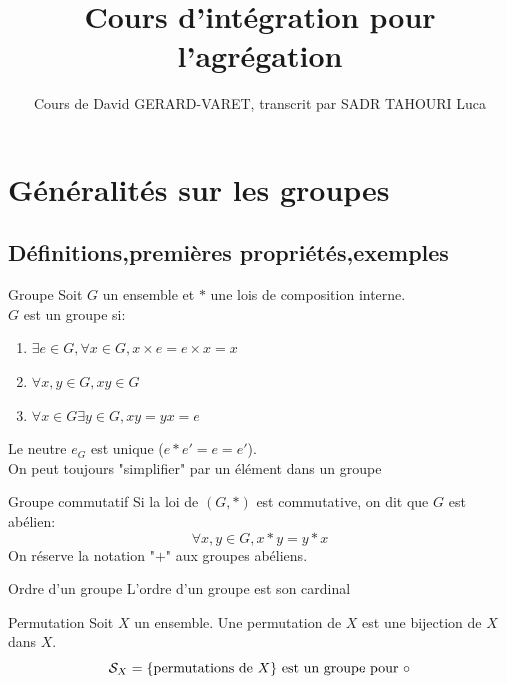 \documentclass[]{report}
\title{Cours d'intégration pour l'agrégation}
\author{Cours de David GERARD-VARET, transcrit par SADR TAHOURI Luca}
\date{}
\begin{document}
    \maketitle
    \tableofcontents

\chapter{Généralités sur les groupes}

\section{Définitions,premières propriétés,exemples}

\begin{df}{Groupe}{}
    Soit $G$ un ensemble et $*$ une lois de composition interne.\\
    $G$ est un groupe si:
    \begin{enumerate}[label=\roman*]
        \item $\exists e\in G,\forall x\in G,x\times e=e \times x=x$
        \item $\forall x,y\in G, xy\in G$
        \item $\forall x\in G\exists y\in G, xy=yx=e$
    \end{enumerate}
    
\end{df}

\begin{re}{}{}
    Le neutre $e_G$ est unique ($e*e'=e=e'$).\\
    On peut toujours "simplifier" par un élément dans un groupe
\end{re}

\begin{df}{Groupe commutatif}{}
    Si la loi de $(G,*)$ est commutative, on dit que $G$ est abélien:
    \[\forall x,y \in G,x*y=y*x\]
    On réserve la notation "$+$" aux groupes abéliens.
\end{df}

\begin{df}{Ordre d'un groupe}{}
    L'ordre d'un groupe est son cardinal
\end{df}

\begin{df}{Permutation}{}
    Soit $X$ un ensemble. Une permutation de $X$ est une bijection de $X$ dans $X$.
    \[\mathcal{S}_X=\{\text{permutations de $X$}\}\text{ est un groupe pour $\circ$}\]
\end{df}
\end{document}
